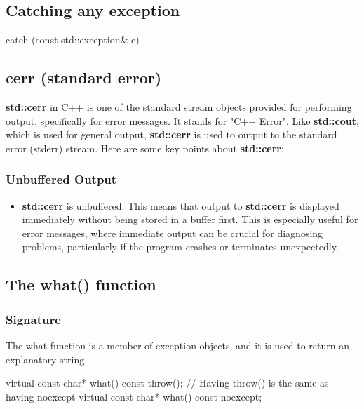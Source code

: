 \documentclass{report}
\begin{document}
\begin{concept}
    \bigbreak \noindent 
    \subsection{Catching any exception}
    \bigbreak \noindent 
    \begin{cppcode}
        catch (const std::exception& e)
    \end{cppcode}

    \bigbreak \noindent 
    \subsection{cerr (standard error)}
    \bigbreak \noindent 
    \textbf{std::cerr} in C++ is one of the standard stream objects provided for performing output, specifically for error messages. It stands for "C++ Error". Like \textbf{std::cout}, which is used for general output, \textbf{std::cerr} is used to output to the standard error (stderr) stream. Here are some key points about \textbf{std::cerr}:
    \bigbreak \noindent 
    \subsubsection{Unbuffered Output}
    \begin{itemize}
        \item \textbf{std::cerr} is unbuffered. This means that output to \textbf{std::cerr} is displayed immediately without being stored in a buffer first. This is especially useful for error messages, where immediate output can be crucial for diagnosing problems, particularly if the program crashes or terminates unexpectedly.
    \end{itemize}

    \bigbreak \noindent 
    \subsection{The what() function}
    \bigbreak \noindent 
    \subsubsection{Signature}
    \bigbreak \noindent 
    The what function is a member of exception objects, and it is used to return an explanatory string.
    \begin{cppcode}
    virtual const char* what() const throw(); // Having throw() is the same as having noexcept
    virtual const char* what() const noexcept;
    \end{cppcode}


\end{concept}
\end{document}
